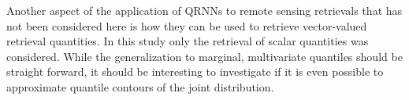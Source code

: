 \documentclass[journal abbreviation, manuscript]{copernicus}
\begin{document}
Another aspect of the application of QRNNs to remote sensing retrievals that has
not been considered here is how they can be used to retrieve vector-valued
retrieval quantities. In this study only the retrieval of scalar quantities was
considered. While the generalization to marginal, multivariate quantiles should
be straight forward, it should be interesting to investigate if it is even
possible to approximate quantile contours of the joint distribution.













%
\end{document}
